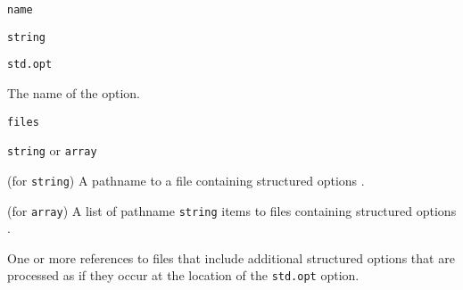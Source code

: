 \begin{itemdescr}

	\pnum \fldname \verb|name|

	\pnum \fldtype \verb|string|

	\pnum \fldval \verb|std.opt|

	\pnum \flddesc
	The name of the option.

\end{itemdescr}

\begin{itemdescr}

	\pnum \fldname \verb|files|

	\pnum \fldtype \verb|string| or \verb|array|

	\pnum \fldval (for \verb|string|)
	A pathname to a file containing structured options .

	\pnum \fldval (for \verb|array|)
	A list of pathname \verb|string| items to files containing structured
	options .

	\pnum \flddesc
	One or more references to files that include additional structured options
	 that are processed as if they occur at the location of the
	\verb|std.opt| option.

\end{itemdescr}

